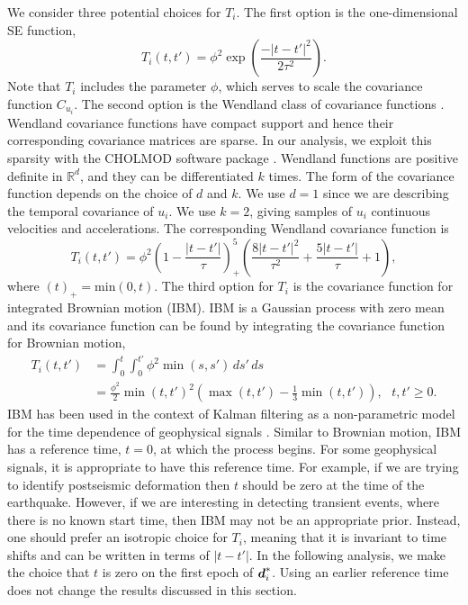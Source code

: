\documentclass[extra,mreferee]{gji}
\begin{document}

We consider three potential choices for $T_i$. The first option is the
one-dimensional SE function,
\begin{equation}\label{eq:TimeSE}
T_i(t,t') = \phi^2\exp\left(\frac{-|t - t'|^2}{2\tau^2}\right).
\end{equation}
Note that $T_i$ includes the parameter $\phi$, which serves to scale
the covariance function $C_{u_i}$. The second option is the Wendland
class of covariance functions \citep{Wendland2005}. Wendland
covariance functions have compact support and hence their
corresponding covariance matrices are sparse. In our analysis, we
exploit this sparsity with the CHOLMOD software package
\citep{Chen2008}. Wendland functions are positive definite in
$\mathbb{R}^d$, and they can be differentiated $k$ times. The form of
the covariance function depends on the choice of $d$ and $k$. We use
$d=1$ since we are describing the temporal covariance of $u_i$. We use
$k=2$, giving samples of $u_i$ continuous velocities and
accelerations. The corresponding Wendland covariance function is
\begin{equation}\label{eq:Wendland} 
T_i(t,t') = \phi^2\left(1 - \frac{|t - t'|}{\tau}\right)^5_+ 
            \left(\frac{8|t - t'|^2}{\tau^2} + \frac{5|t - t'|}{\tau} + 1\right), 
\end{equation} 
where $(t)_+ = \mathrm{min}(0,t)$.
The third option for $T_i$ is the covariance function for integrated
Brownian motion (IBM). IBM is a Gaussian process with zero mean and
its covariance function can be found by integrating the covariance
function for Brownian motion,
\begin{align}\label{eq:IBM}
T_i(t,t') &= \int_0^t \int_0^{t'} \phi^2 \min(s,s') \,ds'\,ds \\
          &= \frac{\phi^2}{2}\min(t,t')^2 \left(\max(t,t') - \frac{1}{3}\min(t,t')\right), \ \ \ t,t' \geq 0.
\end{align}
IBM has been used in the context of Kalman filtering as a
non-parametric model for the time dependence of geophysical signals
\citep[e.g.,][]{Segall1997, McGuire2003, Ohtani2010, Hines2016a}.
Similar to Brownian motion, IBM has a reference time, $t=0$, at which
the process begins. For some geophysical signals, it is appropriate to
have this reference time. For example, if we are trying to identify
postseismic deformation then $t$ should be zero at the time of the
earthquake.  However, if we are interesting in detecting transient
events, where there is no known start time, then IBM may not be an
appropriate prior. Instead, one should prefer an isotropic choice for
$T_i$, meaning that it is invariant to time shifts and can be written
in terms of $|t - t'|$. In the following analysis, we make the choice
that $t$ is zero on the first epoch of $\data_i^*$. Using an earlier
reference time does not change the results discussed in this section.
\end{document}
